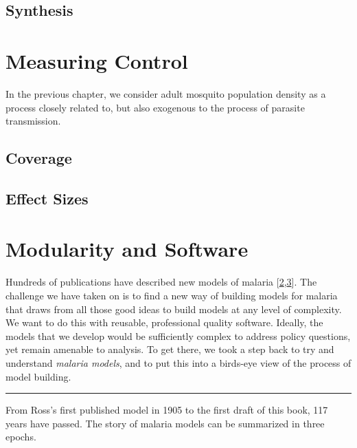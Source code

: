 \documentclass[
]{book}
\begin{document}
\hypertarget{synthesis-1}{%
\section{Synthesis}\label{synthesis-1}}

\hypertarget{measuring-control}{%
\chapter{Measuring Control}\label{measuring-control}}

In the previous chapter, we consider adult mosquito population density as a process closely related to, but also exogenous to the process of parasite transmission.

\hypertarget{coverage}{%
\section{Coverage}\label{coverage}}

\hypertarget{effect-sizes}{%
\section{Effect Sizes}\label{effect-sizes}}

\hypertarget{modularity-and-software}{%
\chapter{Modularity and Software}\label{modularity-and-software}}

Hundreds of publications have described new models of malaria {[}\protect\hyperlink{ref-ReinerRCJ2013SystematicReview}{2},\protect\hyperlink{ref-SmithNR2018AgentbasedModels}{3}{]}. The challenge we have taken on is to find a new way of building models for malaria that draws from all those good ideas to build models at any level of complexity. We want to do this with reusable, professional quality software. Ideally, the models that we develop would be sufficiently complex to address policy questions, yet remain amenable to analysis. To get there, we took a step back to try and understand \emph{malaria models}, and to put this into a birds-eye view of the process of model building.

\begin{center}\rule{0.5\linewidth}{0.5pt}\end{center}

From Ross's first published model in 1905 to the first draft of this book, 117 years have passed. The story of malaria models can be summarized in three epochs.
\end{document}
